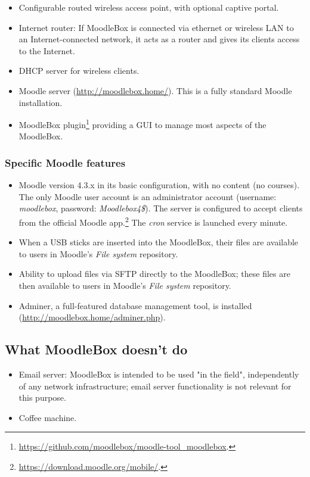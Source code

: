 \documentclass[12pt]{article}
\begin{document}
\begin{itemize}
\item Configurable routed wireless access point, with optional captive portal.
\item Internet router: If MoodleBox is connected via ethernet or wireless LAN to an Internet-connected network, it acts as a router and gives its clients access to the Internet.
\item DHCP server for wireless clients.
\item Moodle server (\url{http://moodlebox.home/}).
This is a fully standard Moodle installation.
\item MoodleBox plugin\footnote{\url{https://github.com/moodlebox/moodle-tool_moodlebox}.} providing a GUI to manage most aspects of the MoodleBox.
\end{itemize}

\subsubsection{Specific Moodle features}
\begin{itemize}
\item Moodle version 4.3.x in its basic configuration, with no content (no courses).
The only Moodle user account is an administrator account (username: \emph{moodlebox}, password: \emph{Moodlebox4\$}).
The server is configured to accept clients from the official Moodle app.\footnote{\url{https://download.moodle.org/mobile/}.} The \textsl{cron} service is launched every minute.
\item When a USB sticks are inserted into the MoodleBox, their files are available to users in Moodle's \textsl{File system} repository.
\item Ability to upload files via SFTP directly to the MoodleBox; these files are then available to users in Moodle's \textsl{File system} repository.
\item Adminer, a full-featured database management tool, is installed (\url{http://moodlebox.home/adminer.php}).
\end{itemize}

\subsection{What MoodleBox doesn't do}

\begin{itemize}
\item Email server: MoodleBox is intended to be used "in the field", independently of any network infrastructure; email server functionality is not relevant for this purpose.
\item Coffee machine.
\end{itemize}
\end{document}
